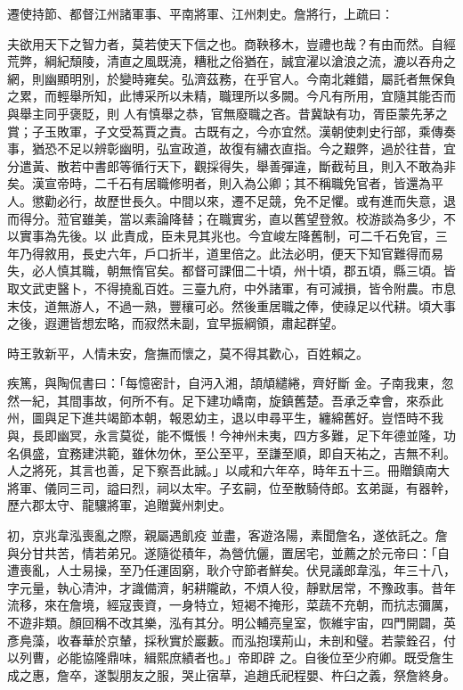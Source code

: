 \begin{pinyinscope}
 遷使持節、都督江州諸軍事、平南將軍、江州刺史。詹將行，上疏曰：



 夫欲用天下之智力者，莫若使天下信之也。商鞅移木，豈禮也哉？有由而然。自經荒弊，綱紀頹陵，清直之風既澆，糟秕之俗猶在，誠宜濯以滄浪之流，漉以吞舟之網，則幽顯明別，於變時雍矣。弘濟茲務，在乎官人。今南北雜錯，屬託者無保負之累，而輕舉所知，此博采所以未精，職理所以多闕。今凡有所用，宜隨其能否而與舉主同乎褒貶，則
 人有慎舉之恭，官無廢職之吝。昔冀缺有功，胥臣蒙先茅之賞；子玉敗軍，子文受蒍賈之責。古既有之，今亦宜然。漢朝使刺史行部，乘傳奏事，猶恐不足以辨彰幽明，弘宣政道，故復有繡衣直指。今之艱弊，過於往昔，宜分遣黃、散若中書郎等循行天下，觀採得失，舉善彈違，斷截茍且，則入不敢為非矣。漢宣帝時，二千石有居職修明者，則入為公卿；其不稱職免官者，皆還為平人。懲勸必行，故歷世長久。中間以來，遷不足競，免不足懼。或有進而失意，退而得分。蒞官雖美，當以素論降替；在職實劣，直以舊望登敘。校游談為多少，不以實事為先後。以
 此責成，臣未見其兆也。今宜峻左降舊制，可二千石免官，三年乃得敘用，長史六年，戶口折半，道里倍之。此法必明，便天下知官難得而易失，必人慎其職，朝無惰官矣。都督可課佃二十頃，州十頃，郡五頃，縣三頃。皆取文武吏醫卜，不得撓亂百姓。三臺九府，中外諸軍，有可減損，皆令附農。市息末伎，道無游人，不過一熟，豐穰可必。然後重居職之俸，使祿足以代耕。頃大事之後，遐邇皆想宏略，而寂然未副，宜早振綱領，肅起群望。



 時王敦新平，人情未安，詹撫而懷之，莫不得其歡心，百姓賴之。



 疾篤，與陶侃書曰：「每憶密計，自沔入湘，頡頏繾綣，齊好斷
 金。子南我東，忽然一紀，其間事故，何所不有。足下建功嶠南，旋鎮舊楚。吾承乏幸會，來忝此州，圖與足下進共竭節本朝，報恩幼主，退以申尋平生，纏綿舊好。豈悟時不我與，長即幽冥，永言莫從，能不慨悵！今神州未夷，四方多難，足下年德並隆，功名俱盛，宜務建洪範，雖休勿休，至公至平，至謙至順，即自天祐之，吉無不利。人之將死，其言也善，足下察吾此誠。」以咸和六年卒，時年五十三。冊贈鎮南大將軍、儀同三司，謚曰烈，祠以太牢。子玄嗣，位至散騎侍郎。玄弟誕，有器幹，歷六郡太守、龍驤將軍，追贈冀州刺史。



 初，京兆韋泓喪亂之際，親屬遇飢疫
 並盡，客遊洛陽，素聞詹名，遂依託之。詹與分甘共苦，情若弟兄。遂隨從積年，為營伉儷，置居宅，並薦之於元帝曰：「自遭喪亂，人士易操，至乃任運固窮，耿介守節者鮮矣。伏見議郎韋泓，年三十八，字元量，執心清沖，才識備濟，躬耕隴畝，不煩人役，靜默居常，不豫政事。昔年流移，來在詹境，經寇喪資，一身特立，短褐不掩形，菜蔬不充朝，而抗志彌厲，不遊非類。顏回稱不改其樂，泓有其分。明公輔亮皇室，恢維宇宙，四門開闢，英彥鳧藻，收春華於京輦，採秋實於巖藪。而泓抱璞荊山，未剖和璧。若蒙銓召，付以列曹，必能協隆鼎味，緝熙庶績者也。」帝即辟
 之。自後位至少府卿。既受詹生成之惠，詹卒，遂製朋友之服，哭止宿草，追趙氏祀程嬰、杵臼之義，祭詹終身。




\end{pinyinscope}

